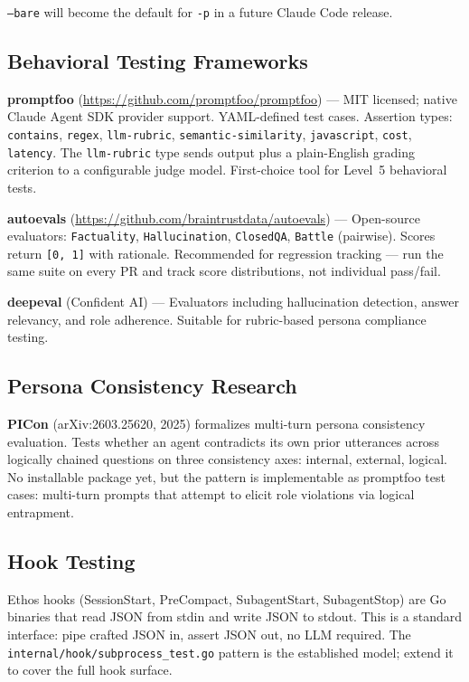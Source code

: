 \documentclass[a4paper,10pt]{article}
\newcommand{\pkg}[1]{\texttt{#1}}
\newcommand{\cmd}[1]{\texttt{#1}}
\newcommand{\fpath}[1]{\texttt{#1}}
\begin{document}
\cmd{--bare} will become the default for \cmd{-p} in a future Claude
Code release.

\subsection{Behavioral Testing Frameworks}

\textbf{promptfoo} (\url{https://github.com/promptfoo/promptfoo}) ---
MIT licensed; native Claude Agent SDK provider support.  YAML-defined
test cases.  Assertion types: \texttt{contains}, \texttt{regex},
\texttt{llm-rubric}, \texttt{semantic-similarity},
\texttt{javascript}, \texttt{cost}, \texttt{latency}.  The
\texttt{llm-rubric} type sends output plus a plain-English grading
criterion to a configurable judge model.  First-choice tool for
Level~5 behavioral tests.

\textbf{autoevals} (\url{https://github.com/braintrustdata/autoevals})
--- Open-source evaluators: \pkg{Factuality}, \pkg{Hallucination},
\pkg{ClosedQA}, \pkg{Battle} (pairwise).  Scores return
\texttt{[0,\,1]} with rationale.  Recommended for regression tracking
--- run the same suite on every PR and track score distributions, not
individual pass/fail.

\textbf{deepeval} (Confident AI) --- Evaluators including
hallucination detection, answer relevancy, and role adherence.
Suitable for rubric-based persona compliance testing.

\subsection{Persona Consistency Research}

\textbf{PICon} (arXiv:2603.25620, 2025) formalizes multi-turn persona
consistency evaluation.  Tests whether an agent contradicts its own
prior utterances across logically chained questions on three
consistency axes: internal, external, logical.  No installable
package yet, but the pattern is implementable as promptfoo test
cases: multi-turn prompts that attempt to elicit role violations via
logical entrapment.

\subsection{Hook Testing}

Ethos hooks (SessionStart, PreCompact, SubagentStart, SubagentStop)
are Go binaries that read JSON from stdin and write JSON to stdout.
This is a standard interface: pipe crafted JSON in, assert JSON out,
no LLM required.  The
\fpath{internal/hook/subprocess\_test.go} pattern is the established
model; extend it to cover the full hook surface.
\end{document}
